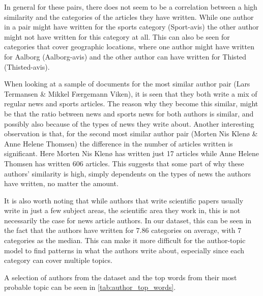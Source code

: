 In general for these pairs, there does not seem to be a correlation between a high similarity and the categories of the articles they have written.
While one author in a pair might have written for the sports category (Sport-avis) the other author might not have written for this category at all.
This can also be seen for categories that cover geographic locations, where one author might have written for Aalborg (Aalborg-avis) and the other author can have written for Thisted (Thisted-avis).

When looking at a sample of documents for the most similar author pair (Lars Termansen \& Mikkel Færgemann Viken), it is seen that they both write a mix of regular news and sports articles.
The reason why they become this similar, might be that the ratio between news and sports news for both authors is similar, and possibly also because of the types of news they write about.
Another interesting observation is that, for the second most similar author pair (Morten Nis Klenø \& Anne Helene Thomsen) the difference in the number of articles written is significant.
Here Morten Nis Klenø has written just 17 articles while Anne Helene Thomsen has written 606 articles.
This suggests that some part of why these authors' similarity is high, simply dependents on the types of news the authors have written, no matter the amount.

It is also worth noting that while authors that write scientific papers usually write in just a few subject areas, the scientific area they work in, this is not necessarily the case for news article authors.
In our dataset, this can be seen in the fact that the authors have written for 7.86 categories on average, with 7 categories as the median.
This can make it more difficult for the author-topic model to find patterns in what the authors write about, especially since each category can cover multiple topics.

A selection of authors from the dataset and the top words from their most probable topic can be seen in \autoref{tab:author_top_words}.

